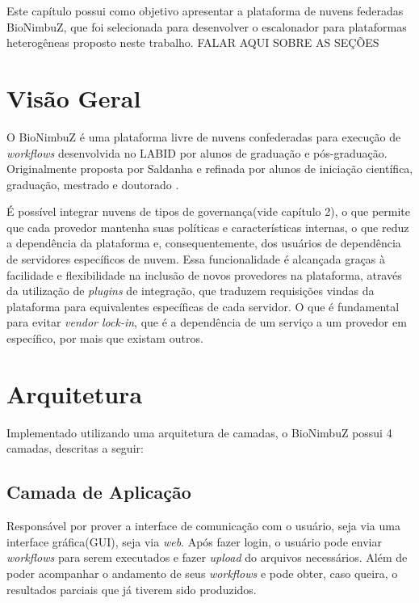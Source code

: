 Este capítulo possui como objetivo apresentar a plataforma de nuvens federadas BioNimbuZ, que foi selecionada para desenvolver o escalonador para plataformas heterogêneas proposto neste trabalho. FALAR AQUI SOBRE AS SEÇÕES

\section{Visão Geral}

O BioNimbuZ é uma plataforma livre de nuvens confederadas para execução de \textit{workflows} desenvolvida no \acrfull{LABID} por alunos de graduação e pós-graduação. Originalmente proposta por Saldanha\cite{Saldanha_BioNimbus} e refinada por alunos de iniciação científica, graduação, mestrado e doutorado\cite{closer12_BioNimbuZ_AHP}\cite{BioNimbuZ_6846526} \cite{6732620_BioNimbuZ_ACOsched}\cite{BioNimbuZ_Breno_Deric}\cite{BioNimbuZ_Vegara}\cite{BioNimbuZ_Willian_C99}.

É possível integrar nuvens de tipos de governança(vide capítulo 2), o que permite que cada provedor mantenha suas políticas e características internas, o que reduz a dependência da plataforma e, consequentemente, dos usuários de dependência de servidores específicos de nuvem. Essa funcionalidade é alcançada graças à facilidade e flexibilidade na inclusão de novos provedores na plataforma, através da utilização de \textit{plugins} de integração, que traduzem requisições vindas da plataforma para equivalentes específicas de cada servidor. O que é fundamental para evitar \textit{vendor lock-in}, que é a dependência de um serviço a um provedor em específico, por mais que existam outros.

\section{Arquitetura}
Implementado utilizando uma arquitetura de camadas, o BioNimbuZ possui 4 camadas, descritas a seguir:
\subsection{Camada de Aplicação} Responsável por prover a interface de comunicação com o usuário, seja via uma interface gráfica(GUI), seja via \textit{web}. Após fazer login, o usuário pode enviar \textit{workflows} para serem executados e fazer \textit{upload} do arquivos necessários. Além de poder acompanhar o andamento de seus \textit{workflows} e pode obter, caso queira, o resultados parciais que já tiverem sido produzidos.
	
